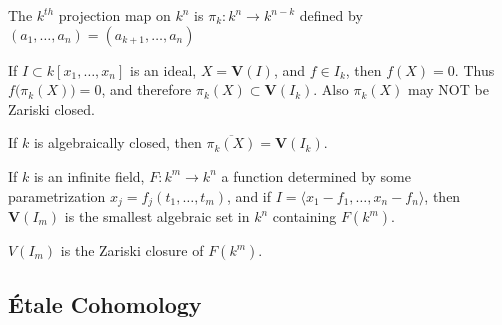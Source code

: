 \documentclass[crop=false,class=article,oneside]{standalone}
\begin{document}
        \begin{definition}
            The $k^{th}$ projection map on $k^{n}$ is
            $\pi_{k}:k^{n}\rightarrow k^{n-k}$ defined by
            $(a_{1},\hdots,a_{n})=(a_{k+1},\hdots,a_{n})$
        \end{definition}
        \begin{remark}
            If $I\subset{k}[x_{1},\hdots,x_{n}]$ is an ideal,
            $X=\mathbf{V}(I)$, and $f\in{I_{k}}$,
            then $f(X)=0$.
            Thus $f\big(\pi_{k}(X)\big)=0$, and therefore
            $\pi_{k}(X)\subset\mathbf{V}(I_k)$.
            Also $\pi_{k}(X)$ may NOT be Zariski closed.
        \end{remark}
        \begin{theorem}
            If $k$ is algebraically closed,
            then $\overline{\pi_k(X)}=\mathbf{V}(I_k)$.
        \end{theorem}
        \begin{theorem}
            If $k$ is an infinite field,
            $F:k^{m}\rightarrow{k^{n}}$ a function determined
            by some parametrization
            $x_{j}=f_{j}(t_{1},\hdots,t_{m})$, and if
            $I=\langle{x_{1}-f_{1}},\hdots,x_{n}-f_{n}\rangle$,
            then $\mathbf{V}(I_m)$ is the smallest algebraic
            set in $k^{n}$ containing $F(k^{m})$.
        \end{theorem}
        \begin{remark}
            $V(I_{m})$ is the Zariski closure of $F(k^{m})$.
        \end{remark}
    \subsection{\'{E}tale Cohomology}
\end{document}
